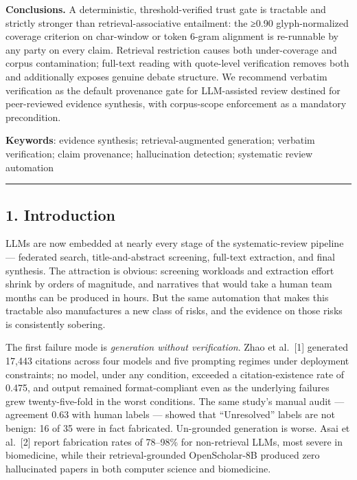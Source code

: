 \documentclass[11pt]{article}
\begin{document}
\textbf{Conclusions.} A deterministic, threshold-verified trust gate is
tractable and strictly stronger than retrieval-associative entailment:
the ≥0.90 glyph-normalized coverage criterion on char-window or token
6-gram alignment is re-runnable by any party on every claim. Retrieval
restriction causes both under-coverage and corpus contamination;
full-text reading with quote-level verification removes both and
additionally exposes genuine debate structure. We recommend verbatim
verification as the default provenance gate for LLM-assisted review
destined for peer-reviewed evidence synthesis, with corpus-scope
enforcement as a mandatory precondition.

\textbf{Keywords}: evidence synthesis; retrieval-augmented generation;
verbatim verification; claim provenance; hallucination detection;
systematic review automation

\begin{center}\rule{0.5\linewidth}{0.5pt}\end{center}

\subsection{1. Introduction}\label{introduction}

LLMs are now embedded at nearly every stage of the systematic-review
pipeline --- federated search, title-and-abstract screening, full-text
extraction, and final synthesis. The attraction is obvious: screening
workloads and extraction effort shrink by orders of magnitude, and
narratives that would take a human team months can be produced in hours.
But the same automation that makes this tractable also manufactures a
new class of risks, and the evidence on those risks is consistently
sobering.

The first failure mode is \emph{generation without verification}. Zhao
et al.~{[}1{]} generated 17,443 citations across four models and five
prompting regimes under deployment constraints; no model, under any
condition, exceeded a citation-existence rate of 0.475, and output
remained format-compliant even as the underlying failures grew
twenty-five-fold in the worst conditions. The same study's manual audit
--- agreement 0.63 with human labels --- showed that ``Unresolved''
labels are not benign: 16 of 35 were in fact fabricated. Un-grounded
generation is worse. Asai et al.~{[}2{]} report fabrication rates of
78--98\% for non-retrieval LLMs, most severe in biomedicine, while their
retrieval-grounded OpenScholar-8B produced zero hallucinated papers in
both computer science and biomedicine.
\end{document}
